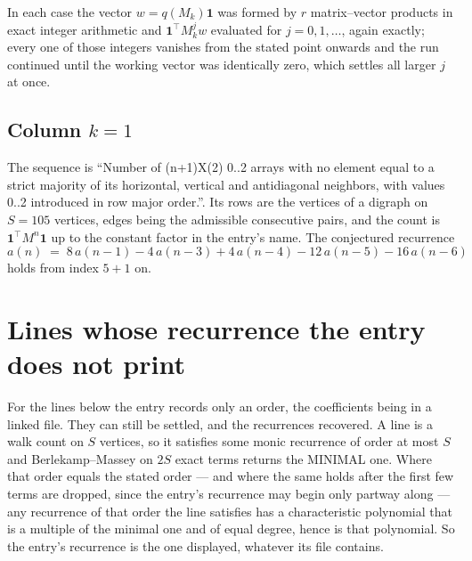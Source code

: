 \documentclass[11pt,a4paper]{article}
\theoremstyle{plain}
\theoremstyle{definition}
\begin{document}
In each case the vector $w=q(M_k)\mathbf{1}$ was formed by $r$ matrix--vector products in
exact integer arithmetic and $\mathbf{1}^{\!\top}M_k^{j}w$ evaluated for $j=0,1,\dots$,
again exactly; every one of those integers vanishes from the stated point onwards and the run
continued until the working vector was identically zero, which settles all larger $j$ at once.

\subsection*{Column $k$$=1$}
The sequence is ``Number of (n+1)X(2) 0..2 arrays with no element equal to a strict majority of its horizontal, vertical and antidiagonal neighbors, with values 0..2 introduced in row major order.''. Its rows are the vertices of a digraph on
$S=105$ vertices, edges being the admissible consecutive pairs, and the count is
$\mathbf{1}^{\!\top}M^{n}\mathbf{1}$ up to the constant factor in the entry's name.
The conjectured recurrence
\[
a(n)\;=\;8\,a(n-1) - 4\,a(n-3) + 4\,a(n-4) - 12\,a(n-5) - 16\,a(n-6)
\]
holds from index $5+1$ on.


\section{Lines whose recurrence the entry does not print}

For the lines below the entry records only an order, the coefficients being in a linked file.
They can still be settled, and the recurrences recovered. A line is a walk count on $S$
vertices, so it satisfies some monic recurrence of order at most $S$ and Berlekamp--Massey on
$2S$ exact terms returns the MINIMAL one. Where that order equals the stated order --- and
where the same holds after the first few terms are dropped, since the entry's recurrence may
begin only partway along --- any recurrence of that order the line satisfies has a
characteristic polynomial that is a multiple of the minimal one and of equal degree, hence is
that polynomial. So the entry's recurrence is the one displayed, whatever its file contains.
\end{document}
